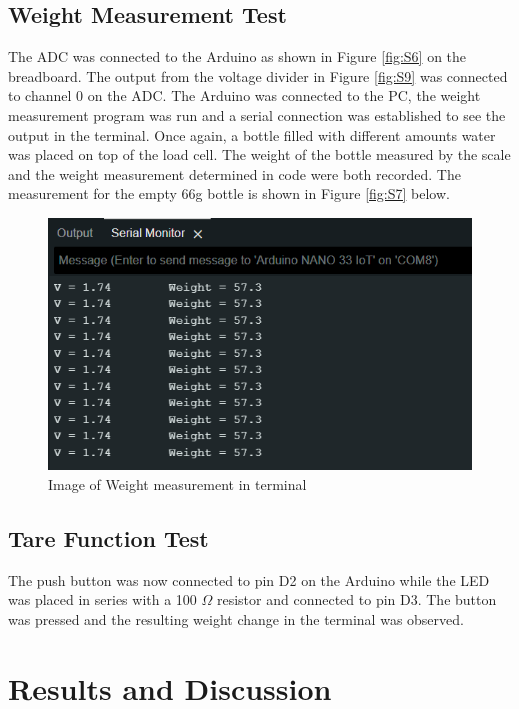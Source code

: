 \documentclass[class=report,11pt,crop=false]{standalone}
\begin{document}
	\subsection{Weight Measurement Test}
	The ADC was connected to the Arduino as shown in Figure \ref{fig:S6} on the breadboard. The output from the voltage divider in Figure \ref{fig:S9} was connected to channel 0 on the ADC. The Arduino was connected to the PC, the weight measurement program was run and a serial connection was established to see the output in the terminal. Once again, a bottle filled with different amounts water was placed on top of the load cell. The weight of the bottle measured by the scale and the weight measurement determined in code were both recorded. The measurement for the empty 66g bottle is shown in Figure \ref{fig:S7} below.
	\begin{figure}[h!]
		\centering
		\includegraphics[width=0.6\linewidth]{Figures/Weight Measurement.png}
		\caption{Image of Weight measurement in terminal}
		\label{fig:S17}
	\end{figure}
	
	\subsection{Tare Function Test}
	The push button was now connected to pin D2 on the Arduino while the LED was placed in series with a 100 $\Omega$ resistor and connected to pin D3. The button was pressed and the resulting weight change in the terminal was observed. 
	 
	\section{Results and Discussion}
\end{document}
